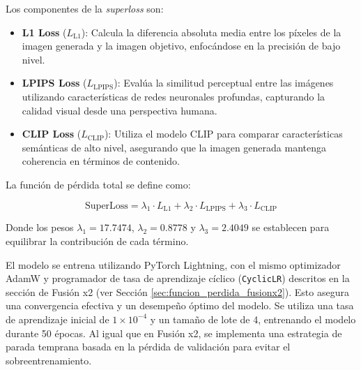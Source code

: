             Los componentes de la \textit{superloss} son:

            \begin{itemize}
                \item \textbf{L1 Loss} ($L_{\text{L1}}$): Calcula la diferencia absoluta media entre los píxeles de la imagen generada y la imagen objetivo, enfocándose en la precisión de bajo nivel.
                \item \textbf{LPIPS Loss} ($L_{\text{LPIPS}}$): Evalúa la similitud perceptual entre las imágenes utilizando características de redes neuronales profundas, capturando la calidad visual desde una perspectiva humana.
                \item \textbf{CLIP Loss} ($L_{\text{CLIP}}$): Utiliza el modelo CLIP para comparar características semánticas de alto nivel, asegurando que la imagen generada mantenga coherencia en términos de contenido.
            \end{itemize}

            La función de pérdida total se define como:

            \[
            \text{SuperLoss} = \lambda_1 \cdot L_{\text{L1}} + \lambda_2 \cdot L_{\text{LPIPS}} + \lambda_3 \cdot L_{\text{CLIP}}
            \]

            Donde los pesos $\lambda_1 = 17.7474$, $\lambda_2 = 0.8778$ y $\lambda_3 = 2.4049$ se establecen para equilibrar la contribución de cada término.


            El modelo se entrena utilizando PyTorch Lightning, con el mismo optimizador AdamW y programador de tasa de aprendizaje cíclico (\texttt{CyclicLR}) descritos en la sección de Fusión x2 (ver Sección \ref{sec:funcion_perdida_fusionx2}). Esto asegura una convergencia efectiva y un desempeño óptimo del modelo. Se utiliza una tasa de aprendizaje inicial de $1 \times 10^{-4}$ y un tamaño de lote de 4, entrenando el modelo durante 50 épocas. Al igual que en Fusión x2, se implementa una estrategia de parada temprana basada en la pérdida de validación para evitar el sobreentrenamiento.

